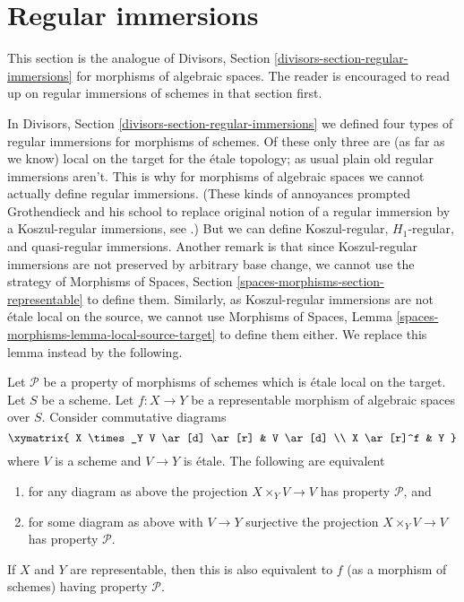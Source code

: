 \section{Regular immersions}
\label{section-regular-immersions}

\noindent
This section is the analogue of
Divisors, Section \ref{divisors-section-regular-immersions}
for morphisms of algebraic spaces. The reader is encouraged to read up
on regular immersions of schemes in that section first.

\medskip\noindent
In
Divisors, Section \ref{divisors-section-regular-immersions}
we defined four types of regular immersions for morphisms of schemes.
Of these only three are (as far as we know) local on the target for
the \'etale topology; as usual plain old regular immersions aren't.
This is why for morphisms of algebraic spaces we cannot actually define
regular immersions. (These kinds of annoyances prompted Grothendieck
and his school to replace original notion of a regular immersion by a
Koszul-regular immersions, see
\cite[Exposee VII, Definition 1.4]{SGA6}.)
But we can define Koszul-regular, $H_1$-regular, and quasi-regular immersions.
Another remark is that since Koszul-regular immersions are not preserved by
arbitrary base change, we cannot use the strategy of
Morphisms of Spaces, Section \ref{spaces-morphisms-section-representable}
to define them. Similarly, as Koszul-regular immersions are not \'etale local
on the source, we cannot use
Morphisms of Spaces, Lemma \ref{spaces-morphisms-lemma-local-source-target}
to define them either. We replace this lemma instead by the
following.

\begin{lemma}
\label{lemma-representable-etale-local-target}
Let $\mathcal{P}$ be a property of morphisms of schemes which is \'etale
local on the target. Let $S$ be a scheme.
Let $f : X \to Y$ be a representable morphism of algebraic spaces over $S$.
Consider commutative diagrams
$$
\xymatrix{
X \times_Y V \ar[d] \ar[r] & V \ar[d] \\
X \ar[r]^f & Y
}
$$
where $V$ is a scheme and $V \to Y$ is \'etale.
The following are equivalent
\begin{enumerate}
\item for any diagram as above the projection $X \times_Y V \to V$
has property $\mathcal{P}$, and
\item for some diagram as above with $V \to Y$ surjective
the projection $X \times_Y V \to V$ has property $\mathcal{P}$.
\end{enumerate}
If $X$ and $Y$ are representable, then this is also equivalent to
$f$ (as a morphism of schemes) having property $\mathcal{P}$.
\end{lemma}

